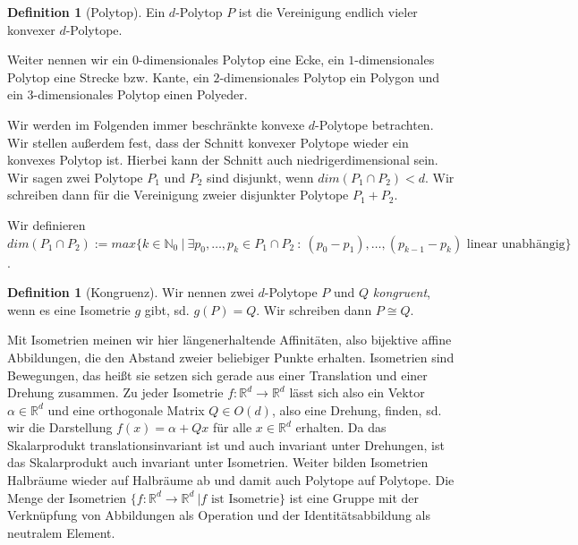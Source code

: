 \documentclass[11pt,titlepage]{article}
\newcommand{\setN}{\mathbb{N}}
\newcommand{\setR}{\mathbb{R}}
\theoremstyle{definition}
\newtheorem{definition}[theorem]{Definition}
\theoremstyle{remark}
\begin{document}
	\begin{definition}[Polytop]
		Ein $d$-Polytop $P$ ist die Vereinigung endlich vieler konvexer 
		$d$-Polytope.
	\end{definition}
	
	Weiter nennen wir ein $0$-dimensionales Polytop eine Ecke, ein $1$-dimensionales Polytop eine Strecke bzw. Kante, ein $2$-dimensionales Polytop ein Polygon und ein $3$-dimensionales Polytop einen Polyeder.
	
	
	Wir werden im Folgenden immer beschränkte konvexe $d$-Polytope betrachten. Wir stellen außerdem fest, dass 
	der Schnitt konvexer Polytope wieder ein konvexes Polytop ist. Hierbei kann der Schnitt auch niedrigerdimensional 
	sein. Wir sagen zwei Polytope $P_1$ und $P_2$ sind disjunkt, wenn $dim(P_1\cap P_2)<d$. Wir schreiben dann 
	für die Vereinigung zweier disjunkter Polytope $P_1+P_2$.
	
	Wir definieren $dim(P_1\cap P_2):=max\{k\in\setN_0\ \vert\ \exists p_0,\ldots,p_k\in P_1\cap P_2\ :
	\ (p_0-p_1),\dots,(p_{k-1}-p_k)\text{ linear unabhängig}\}$.
	
	\begin{definition}[Kongruenz]
		Wir nennen zwei $d$-Polytope $P$ und $Q$ \textsl{kongruent}, wenn es eine Isometrie $g$ gibt, sd. 
		$g(P)=Q$. Wir schreiben dann $P\cong Q$.
	\end{definition}

	 Mit Isometrien meinen wir hier längenerhaltende Affinitäten, also bijektive affine Abbildungen, die den Abstand zweier beliebiger Punkte erhalten. 
	 Isometrien sind Bewegungen, das heißt sie setzen sich 
	 gerade aus einer Translation und einer Drehung zusammen. Zu jeder 
	 Isometrie $f:\setR^d\to\setR^d$ lässt sich also ein Vektor 
	 $\alpha\in\setR^d$ und eine orthogonale Matrix $Q\in O(d)$, also 
	 eine Drehung, finden, sd. wir 
	 die Darstellung $f(x)=\alpha + Qx$ für alle $x\in \setR^d$ erhalten. 
	 Da das Skalarprodukt translationsinvariant ist und 
	 auch invariant unter Drehungen, ist das Skalarprodukt auch invariant 
	 unter Isometrien. Weiter bilden Isometrien Halbräume wieder auf 
	 Halbräume ab und damit auch Polytope auf Polytope. Die Menge 
	 der Isometrien $\{f:\setR^d\to\setR^d\ \vert f\text{ ist Isometrie}\}$ ist eine Gruppe mit der Verknüpfung von Abbildungen als 
	 Operation und der Identitätsabbildung als neutralem Element. 
\end{document}
